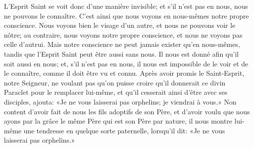 L’Esprit Saint se voit donc d’une manière invisible;
	et s’il n’est pas en nous, nous ne pouvons le connaître.
C’est ainsi que nous voyons en nous-mêmes notre propre conscience.
Nous voyons bien le visage d’un autre,
	et nous ne pouvons voir le nôtre;
	au contraire, nous voyons notre propre conscience,
	et nous ne voyons pas celle d’autrui.
Mais notre conscience ne peut jamais exister qu’en nous-mêmes,
	tandis que l’Esprit Saint peut être aussi sans nous.
Il nous est donné afin qu’il soit aussi en nous;
	et, s’il n’est pas en nous,
		il nous est impossible de le voir et de le connaître,
	comme il doit être vu et connu.
Après avoir promis le Saint-Esprit,
	notre Seigneur, ne voulant pas qu’on puisse croire
		qu’il donnerait ce divin Paraclet pour le remplacer lui-même,
	et qu’il cesserait ainsi d’être avec ses disciples,
	ajouta: «Je ne vous laisserai pas orphelins; je viendrai à vous.»
Non content d’avoir fait de nous les fils adoptifs de son Père,
	et d’avoir voulu que nous ayons par la grâce le même Père
		qui est son Père par nature,
	il nous montre lui-même une tendresse en quelque sorte paternelle,
	lorsqu’il dit: «Je ne vous laisserai pas orphelins.»
